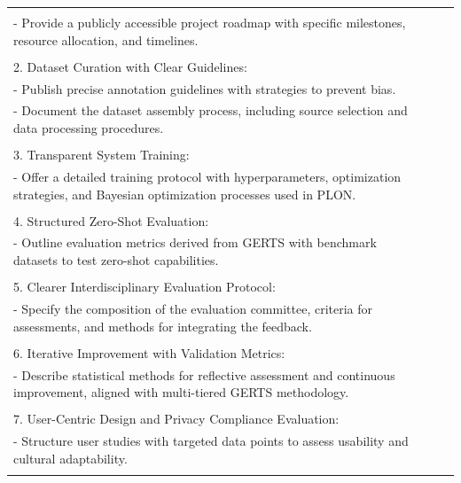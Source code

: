 \begin{center}
\begin{longtable}{p{}p{}p{}}
{    \multicolumn{1}{p{.75\textwidth}}{1. Detailed System Implementation Plan:} \\
    \multicolumn{1}{p{.75\textwidth}}{- Provide a publicly accessible project roadmap with specific milestones, resource allocation, and timelines.} \\ \\
    \multicolumn{1}{p{.75\textwidth}}{2. Dataset Curation with Clear Guidelines:} \\
    \multicolumn{1}{p{.75\textwidth}}{- Publish precise annotation guidelines with strategies to prevent bias.} \\
    \multicolumn{1}{p{.75\textwidth}}{- Document the dataset assembly process, including source selection and data processing procedures.} \\ \\
    \multicolumn{1}{p{.75\textwidth}}{3. Transparent System Training:} \\
    \multicolumn{1}{p{.75\textwidth}}{- Offer a detailed training protocol with hyperparameters, optimization strategies, and Bayesian optimization processes used in PLON.} \\ \\
    \multicolumn{1}{p{.75\textwidth}}{4. Structured Zero-Shot Evaluation:} \\
    \multicolumn{1}{p{.75\textwidth}}{- Outline evaluation metrics derived from GERTS with benchmark datasets to test zero-shot capabilities.} \\ \\
    \multicolumn{1}{p{.75\textwidth}}{5. Clearer Interdisciplinary Evaluation Protocol:} \\
    \multicolumn{1}{p{.75\textwidth}}{- Specify the composition of the evaluation committee, criteria for assessments, and methods for integrating the feedback.} \\ \\
    \multicolumn{1}{p{.75\textwidth}}{6. Iterative Improvement with Validation Metrics:} \\
    \multicolumn{1}{p{.75\textwidth}}{- Describe statistical methods for reflective assessment and continuous improvement, aligned with multi-tiered GERTS methodology.} \\ \\
    \multicolumn{1}{p{.75\textwidth}}{7. User-Centric Design and Privacy Compliance Evaluation:} \\
    \multicolumn{1}{p{.75\textwidth}}{- Structure user studies with targeted data points to assess usability and cultural adaptability.} \\
}
\end{longtable}
\end{center}
